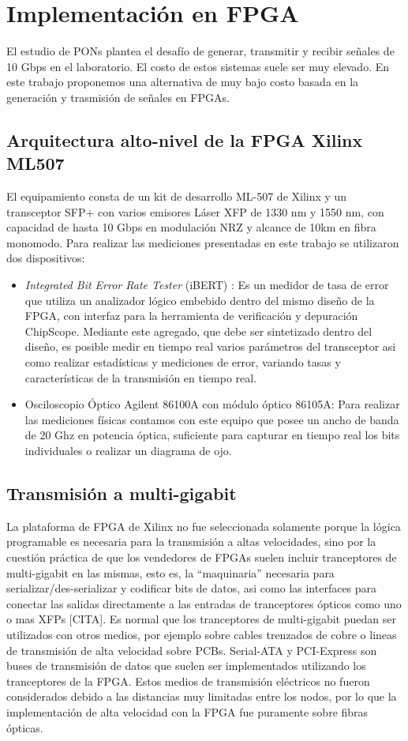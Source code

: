 \section{Implementación en FPGA}
El estudio de PONs plantea el desafío de generar, transmitir y recibir
señales de 10 Gbps en el laboratorio. El costo de estos sistemas
suele ser muy elevado. En este trabajo proponemos una alternativa de muy
bajo costo basada en la generación y trasmisión de señales en FPGAs.

\subsection{Arquitectura alto-nivel de la FPGA Xilinx ML507}
El equipamiento consta de un kit de desarrollo ML-507 de Xilinx y un
transceptor SFP+ con varios emisores Láser XFP de 1330 nm y 1550 nm, con capacidad de hasta 10 Gbps
en modulación NRZ y alcance de 10km en fibra monomodo. Para realizar
las mediciones presentadas en este trabajo se utilizaron dos dispositivos:
\begin{itemize}
 \item {\em Integrated Bit Error Rate Tester} (iBERT) \cite{4gtxs}: Es
un medidor de tasa de error que utiliza un analizador lógico embebido dentro
del mismo diseño de la FPGA, con interfaz para la herramienta de
verificación y depuración ChipScope. Mediante este agregado, que debe
ser sintetizado dentro del diseño, es posible medir en tiempo real
varios parámetros del transceptor asi como realizar estadísticas y
mediciones de error, variando tasas y características de la transmisión
en tiempo real.
 \item Osciloscopio Óptico Agilent 86100A con módulo óptico 86105A: Para
realizar las mediciones físicas contamos con este equipo que posee un
ancho de banda de 20 Ghz en potencia óptica, suficiente para capturar en
tiempo real los bits individuales o realizar un diagrama de ojo.
\end{itemize}
\subsection{Transmisión a multi-gigabit}
La plataforma de FPGA de Xilinx no fue seleccionada solamente porque la lógica programable es necesaria para la transmisión a altas velocidades, sino por la cuestión práctica de que los vendedores de FPGAs suelen incluir tranceptores de multi-gigabit en las mismas, esto es, la ``maquinaria'' necesaria para serializar/des-serializar y codificar bits de datos, asi como las interfaces para conectar las salidas directamente a las entradas de tranceptores ópticos como uno o mas XFPs [CITA].
Es normal que los tranceptores de multi-gigabit puedan ser utilizados con otros medios, por ejemplo sobre cables trenzados de cobre o lineas de transmisión de alta velocidad sobre PCBs. Serial-ATA y PCI-Express son buses de transmisión de datos que suelen ser implementados utilizando los tranceptores de la FPGA. Estos medios de transmisión eléctricos no fueron considerados debido a las distancias muy limitadas entre los nodos, por lo que la implementación de alta velocidad con la FPGA fue puramente sobre fibras ópticas.

